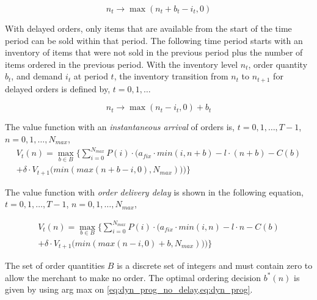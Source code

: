 \begin{equation}
	n_t \rightarrow \max(n_t + b_t - i_t, 0)
\end{equation}

With delayed orders, only items that are available from the start of the time period can be sold within that period.
The following time period starts with an inventory of items that were not sold in the previous period plus the number of items ordered in the previous period.
With the inventory level $n_t$, order quantity $b_t$, and demand $i_t$ at period $t$, the inventory transition from $n_t$ to $n_{t+1}$ for delayed orders is defined by, $t = 0, 1, \ldots$

\begin{equation}
n_t \rightarrow \max(n_t - i_t, 0) + b_t
\end{equation}

The value function with an \textit{instantaneous arrival} of orders is, $t=0,1,\ldots,T-1$, $n=0,1,\ldots,N_{max}$,
\begin{equation}
\begin{split}
V_t(n) = \max_{b \in B} \Bigg\{
\sum_{i = 0}^{N_{max}}
P(i) \cdot \Big(
a_{fix} \cdot min(i, n + b) %
- l \cdot (n + b) %
- C(b) %
 \\
+ \delta \cdot V_{t+1}\big(min(max(n + b - i, 0), N_{max})\big)
\Big)\Bigg\}
\end{split}
\label{eq:dyn_prog_no_delay}
\end{equation}

The value function with \textit{order delivery delay} is shown in the following equation, $t=0,1,\ldots,T-1$, $n=0,1,\ldots,N_{max}$,

\begin{equation}
\begin{split}
V_t(n) = \max_{b \in B} \Bigg\{
	\sum_{i = 0}^{N_{max}} 
		P(i) \cdot \Big(
			a_{fix} \cdot min(i, n) %
			- l \cdot n %
			- C(b) %
		 \\
		+ \delta \cdot V_{t+1}\big(min(max(n - i, 0) + b, N_{max})\big)
	\Big)\Bigg\}
\end{split}
\label{eq:dyn_prog}
\end{equation}

The set of order quantities $B$ is a discrete set of integers and must contain zero to allow the merchant to make no order.
The optimal ordering decision $b^*(n)$ is given by using arg max on \cref{eq:dyn_prog_no_delay,eq:dyn_prog}.

